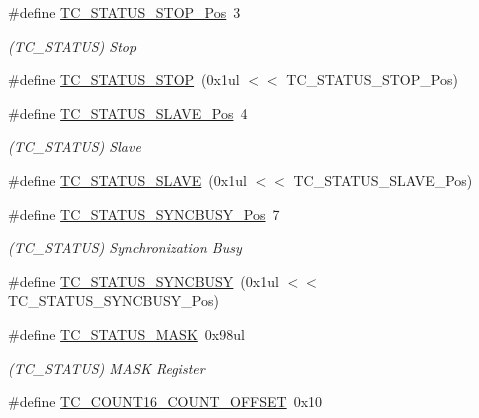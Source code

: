 \begin{DoxyCompactItemize}
\#define \mbox{\hyperlink{group___s_a_m_d21___t_c_ga100f3c31d8974736df3227ac59df5190}{T\+C\+\_\+\+S\+T\+A\+T\+U\+S\+\_\+\+S\+T\+O\+P\+\_\+\+Pos}}~3
\begin{DoxyCompactList}\small\item\em (T\+C\+\_\+\+S\+T\+A\+T\+US) Stop \end{DoxyCompactList}\item 
\#define \mbox{\hyperlink{group___s_a_m_d21___t_c_ga6b580c822a95d531a86d7acce6cb30e7}{T\+C\+\_\+\+S\+T\+A\+T\+U\+S\+\_\+\+S\+T\+OP}}~(0x1ul $<$$<$ T\+C\+\_\+\+S\+T\+A\+T\+U\+S\+\_\+\+S\+T\+O\+P\+\_\+\+Pos)
\item 
\#define \mbox{\hyperlink{group___s_a_m_d21___t_c_ga5caa18b1cc9cd3285aa2b76b47a7de6c}{T\+C\+\_\+\+S\+T\+A\+T\+U\+S\+\_\+\+S\+L\+A\+V\+E\+\_\+\+Pos}}~4
\begin{DoxyCompactList}\small\item\em (T\+C\+\_\+\+S\+T\+A\+T\+US) Slave \end{DoxyCompactList}\item 
\#define \mbox{\hyperlink{group___s_a_m_d21___t_c_ga283ce3f926ce4b989ea0d36416309912}{T\+C\+\_\+\+S\+T\+A\+T\+U\+S\+\_\+\+S\+L\+A\+VE}}~(0x1ul $<$$<$ T\+C\+\_\+\+S\+T\+A\+T\+U\+S\+\_\+\+S\+L\+A\+V\+E\+\_\+\+Pos)
\item 
\#define \mbox{\hyperlink{group___s_a_m_d21___t_c_ga210859224c67610955233419fbf45ccb}{T\+C\+\_\+\+S\+T\+A\+T\+U\+S\+\_\+\+S\+Y\+N\+C\+B\+U\+S\+Y\+\_\+\+Pos}}~7
\begin{DoxyCompactList}\small\item\em (T\+C\+\_\+\+S\+T\+A\+T\+US) Synchronization Busy \end{DoxyCompactList}\item 
\#define \mbox{\hyperlink{group___s_a_m_d21___t_c_gaa8d4248272632fccc8680b0dbdd494de}{T\+C\+\_\+\+S\+T\+A\+T\+U\+S\+\_\+\+S\+Y\+N\+C\+B\+U\+SY}}~(0x1ul $<$$<$ T\+C\+\_\+\+S\+T\+A\+T\+U\+S\+\_\+\+S\+Y\+N\+C\+B\+U\+S\+Y\+\_\+\+Pos)
\item 
\#define \mbox{\hyperlink{group___s_a_m_d21___t_c_ga67067da5f170838144218f04778b4d7a}{T\+C\+\_\+\+S\+T\+A\+T\+U\+S\+\_\+\+M\+A\+SK}}~0x98ul
\begin{DoxyCompactList}\small\item\em (T\+C\+\_\+\+S\+T\+A\+T\+US) M\+A\+SK Register \end{DoxyCompactList}\item 
\#define \mbox{\hyperlink{group___s_a_m_d21___t_c_gad5527ff1e45cc3707a98b68c4ff18c64}{T\+C\+\_\+\+C\+O\+U\+N\+T16\+\_\+\+C\+O\+U\+N\+T\+\_\+\+O\+F\+F\+S\+ET}}~0x10
$$
\end{DoxyCompactItemize}
